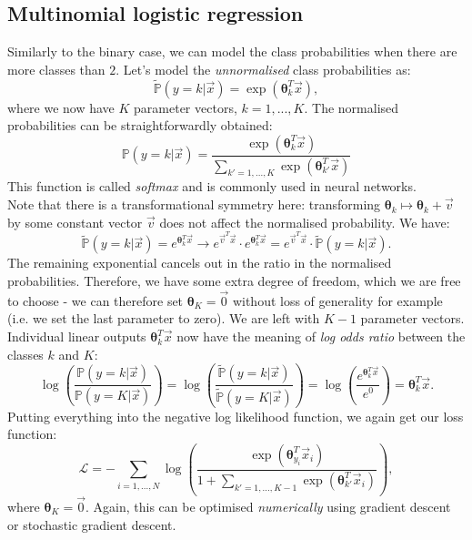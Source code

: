 \newpage
\subsection{Multinomial logistic regression}
Similarly to the binary case, we can model the class probabilities when there are more classes than $2$. Let's model the \textit{unnormalised} class probabilities as:
\begin{equation*}
\tilde{\mathbb{P}}(y = k | \vec{x}) = \exp\left( \pmb{\theta}_k^T \vec{x} \right),
\end{equation*}
where we now have $K$ parameter vectors, $k = 1,...,K$. The normalised probabilities can be straightforwardly obtained:
\begin{equation*}
\mathbb{P}(y = k | \vec{x}) = \frac{\exp\left( \pmb{\theta}_k^T \vec{x} \right)}{\sum_{k'=1,...,K} \exp(\pmb{\theta}_{k'}^T \vec{x})}
\end{equation*}
This function is called \textit{softmax} and is commonly used in neural networks.\\

Note that there is a transformational symmetry here: transforming $\pmb{\theta}_k \mapsto \pmb{\theta}_k + \vec{v}$ by some constant vector $\vec{v}$ does not affect the normalised probability. We have:
\begin{equation*}
\tilde{\mathbb{P}}(y = k | \vec{x}) = e^{\pmb{\theta}_k^T\vec{x}} \rightarrow e^{\vec{v}^T \vec{x}} \cdot e^{\pmb{\theta}_k^T \vec{x}} = e^{\vec{v}^T \vec{x}} \cdot \tilde{\mathbb{P}}(y = k | \vec{x}).
\end{equation*}
The remaining exponential cancels out in the ratio in the normalised probabilities. Therefore, we have some extra degree of freedom, which we are free to choose - we can therefore set $\pmb{\theta}_K = \vec{0}$ without loss of generality for example (i.e. we set the last parameter to zero). We are left with $K-1$ parameter vectors.\\

Individual linear outputs $\pmb{\theta}_k^T \vec{x}$ now have the meaning of \textit{log odds ratio} between the classes $k$ and $K$:
\begin{equation*}
\log\left( \frac{\mathbb{P}(y = k | \vec{x})}{\mathbb{P}(y = K | \vec{x})} \right) = \log\left( \frac{\tilde{\mathbb{P}}(y = k | \vec{x})}{\tilde{\mathbb{P}}(y = K | \vec{x})} \right) = \log\left( \frac{e^{\pmb{\theta}_k^T \vec{x}}}{e^0} \right) = \pmb{\theta}_k^T \vec{x}.
\end{equation*}
Putting everything into the negative log likelihood function, we again get our loss function:
\begin{equation*}
\mathcal{L} = - \sum_{i=1,...,N} \log\left( \frac{\exp(\pmb{\theta}_{y_i}^T \vec{x}_i)}{1 + \sum_{k' = 1,...,K-1} \exp\left( \pmb{\theta}_{k'}^T \vec{x}_i \right)}\right),
\end{equation*}
where $\pmb{\theta}_K = \vec{0}$. Again, this can be optimised \textit{numerically} using gradient descent or stochastic gradient descent.


